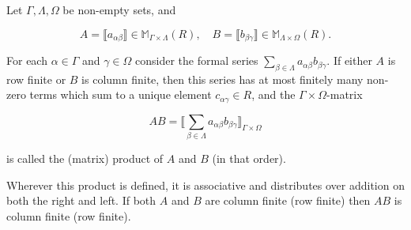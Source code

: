 Let $\Gamma, \Lambda, \Omega$ be non-empty sets, and

$$A = \llbracket a_{\alpha\beta} \rrbracket \in \mathbb{M}_{\Gamma \times \Lambda}(R), \quad B = \llbracket b_{\beta\gamma} \rrbracket \in \mathbb{M}_{\Lambda \times \Omega}(R).$$

For each $\alpha \in \Gamma$ and $\gamma \in \Omega$ consider the formal series $\sum_{\beta \in \Lambda} a_{\alpha\beta} b_{\beta\gamma}$. If either $A$ is row finite or $B$ is column finite, then this series has at most finitely many non-zero terms which sum to a unique element $c_{\alpha\gamma} \in R$, and the $\Gamma \times \Omega$-matrix

$$AB = \llbracket \sum_{\beta \in \Lambda} a_{\alpha\beta} b_{\beta\gamma} \rrbracket_{\Gamma \times \Omega}$$

is called the (matrix) product of $A$ and $B$ (in that order).

Wherever this product is defined, it is associative and distributes over addition on both the right and left. If both $A$ and $B$ are column finite (row finite) then $AB$ is column finite (row finite).
